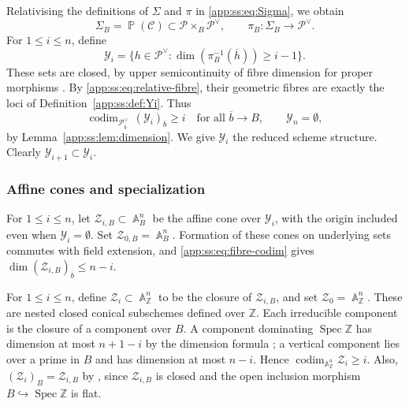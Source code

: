\documentclass[a4paper,11pt, twoside,reqno]{amsart}
\theoremstyle{plain}
\theoremstyle{definition}
\theoremstyle{remark}
\newcommand{\ZZ}{\mathbb{Z}}
\DeclareMathOperator{\codim}{codim}
\DeclareMathOperator{\A}{\mathbb{A}}
\DeclareMathOperator{\PP}{\mathbb{P}}
\DeclareMathOperator{\Spec}{Spec}
\renewcommand{\bar}{\overline}
\renewcommand{\leq}{\leqslant}
\renewcommand{\geq}{\geqslant}
\numberwithin{equation}{section}
\begin{document}
Relativising the definitions of $\Sigma$ and $\pi$ in \eqref{app:ss:eq:Sigma},
we obtain
\[
 \Sigma_B=\PP(\mathcal C)
       \subset\mathcal P\times_B\mathcal P^\vee,
 \qquad \pi_B:\Sigma_B\longrightarrow\mathcal P^\vee.
\]
For $1\leq i\leq n$, define
\begin{equation*}
 \mathcal Y_i=\{h\in\mathcal P^\vee:
                    \dim(\pi_B^{-1}(\bar h))\geq i-1\}.
\end{equation*}
These sets are closed, by upper semicontinuity of fibre dimension for
proper morphisms \cite[\href{https://stacks.math.columbia.edu/tag/0D4I}{Tag 0D4I}]{TSta}.
By \eqref{app:ss:eq:relative-fibre}, their
geometric fibres are exactly the loci of Definition~\ref{app:ss:def:Yi}. Thus
\begin{equation}\label{app:ss:eq:fibre-codim}
 \codim_{\mathcal P^\vee_{\bar b}}\,(\mathcal Y_i)_{\bar b}\geq i
 \quad\text{for all }\bar b\to B,
 \qquad\mathcal Y_n=\emptyset,
\end{equation}
by Lemma~\ref{app:ss:lem:dimension}.
We give $\mathcal Y_i$ the reduced scheme structure.
Clearly $\mathcal Y_{i+1} \subset \mathcal Y_i$.

\subsubsection{Affine cones and specialization}
For $1\leq i\leq n$, let $\mathcal Z_{i,B}\subset\A^n_B$ be
the affine cone over $\mathcal Y_i$,
with the origin included even when $\mathcal Y_i=\emptyset$.
Set $\mathcal Z_{0,B}=\A^n_B$.
Formation of these cones on underlying sets commutes with field
extension, and \eqref{app:ss:eq:fibre-codim} gives
$\dim (\mathcal Z_{i,B})_{\bar b}\leq n-i$.

For $1\leq i\leq n$, define $\mathcal Z_i\subset\A^n_\ZZ$ to be the
closure of $\mathcal Z_{i,B}$, and set $\mathcal Z_0=\A^n_\ZZ$.
These are nested closed conical subschemes defined over $\ZZ$.
Each irreducible component is the closure of a component over $B$.
A component dominating $\Spec\ZZ$ has dimension at most $n+1-i$ by
the dimension formula \cite[\href{https://stacks.math.columbia.edu/tag/02JU}{Tag 02JU}]{TSta}; a vertical component
lies over a prime in $B$ and has dimension at most $n-i$.
Hence $\codim_{\A^n_\ZZ}\mathcal Z_i\geq i$.
Also, $(\mathcal Z_i)_B = \mathcal Z_{i,B}$
by \cite[\href{https://stacks.math.columbia.edu/tag/081I}{Tag 081I}]{TSta},
since $\mathcal Z_{i,B}$ is closed
and the open inclusion morphism $B\hookrightarrow \Spec\ZZ$ is flat.
\end{document}
